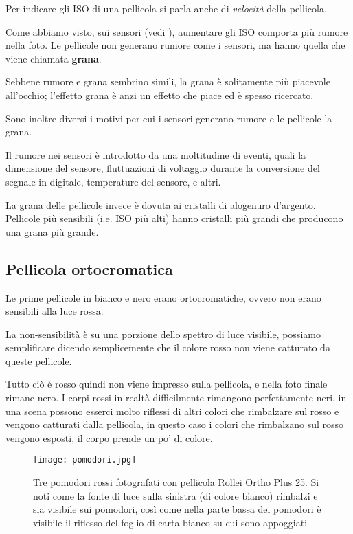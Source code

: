 Per indicare gli ISO di una pellicola si parla anche di \textit{velocità} della pellicola.

Come abbiamo visto, sui sensori (vedi ), aumentare gli ISO comporta più rumore nella foto.
Le pellicole non generano rumore come i sensori, ma hanno quella che viene chiamata \textbf{grana}.

Sebbene rumore e grana sembrino simili, la grana è solitamente più piacevole all'occhio; l'effetto grana è anzi un effetto che piace ed è spesso ricercato.

Sono inoltre diversi i motivi per cui i sensori generano rumore e le pellicole la grana.

Il rumore nei sensori è introdotto da una moltitudine di eventi, quali la dimensione del sensore, fluttuazioni di voltaggio durante la conversione del segnale in digitale, temperature del sensore, e altri.

La grana delle pellicole invece è dovuta ai cristalli di alogenuro d'argento. Pellicole più sensibili (i.e. ISO più alti) hanno cristalli più grandi che producono una grana più grande.


\subsection{Pellicola ortocromatica} \label{subsec:pellicolaorto}
Le prime pellicole in bianco e nero erano ortocromatiche, ovvero non erano sensibili alla luce rossa.

La non-sensibilità è su una porzione dello spettro di luce visibile, possiamo semplificare dicendo semplicemente che il colore rosso non viene catturato da queste pellicole.

Tutto ciò è rosso quindi non viene impresso sulla pellicola, e nella foto finale rimane nero.
I corpi rossi in realtà difficilmente rimangono perfettamente neri, in una scena possono esserci molto riflessi di altri colori che rimbalzare sul rosso e vengono catturati dalla pellicola, in questo caso i colori che rimbalzano sul rosso vengono esposti, il corpo prende un po' di colore.

\begin{figure}[H]
    \centering
    \texttt{[image: pomodori.jpg]}
    \caption{
        Tre pomodori rossi fotografati con pellicola Rollei Ortho Plus 25. Si noti come la fonte di luce sulla sinistra (di colore bianco) rimbalzi e sia visibile sui pomodori, così come nella parte bassa dei pomodori è visibile il riflesso del foglio di carta bianco su cui sono appoggiati
    }
\end{figure}

